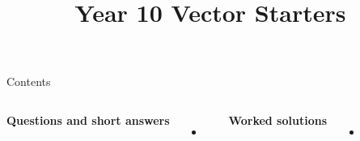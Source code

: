 \documentclass{beamer}
\title{Year 10 Vector Starters}
\date{}
\begin{document}
\frame{\titlepage}

\begin{frame}{Contents}
\small
\begin{columns}[T]
\textbf{Questions and short answers}
\begin{itemize}
  \item \hyperlink{q-st1}{}
\end{itemize}

\textbf{Worked solutions}
\begin{itemize}
  \item \hyperlink{work-st1}{}
\end{itemize}
\end{columns}
\end{frame}
\end{document}
